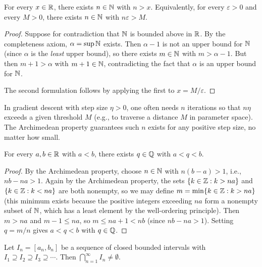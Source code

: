 \documentclass[11pt,a4paper]{article}
\begin{document}
\begin{theorem}
\label{thm:archimedean}
For every $x \in \mathbb{R}$, there exists $n \in \mathbb{N}$ with $n > x$.
Equivalently, for every $\varepsilon > 0$ and every $M > 0$, there exists
$n \in \mathbb{N}$ with $n\varepsilon > M$.
\end{theorem}

\begin{proof}
Suppose for contradiction that $\mathbb{N}$ is bounded above in $\mathbb{R}$. By the
completeness axiom, $\alpha = \sup \mathbb{N}$ exists. Then $\alpha - 1$ is not
an upper bound for $\mathbb{N}$ (since $\alpha$ is the \emph{least} upper
bound), so there exists $m \in \mathbb{N}$ with $m > \alpha - 1$. But then
$m + 1 > \alpha$ with $m + 1 \in \mathbb{N}$, contradicting the fact that
$\alpha$ is an upper bound for $\mathbb{N}$.

The second formulation follows by applying the first to
$x = M/\varepsilon$.
\end{proof}

\begin{example}
\label{ex:archimedean_step_size}
In gradient descent with step size $\eta > 0$, one often needs
$n$ iterations so that $n\eta$ exceeds a given threshold $M$
(e.g., to traverse a distance $M$ in parameter space). The Archimedean
property guarantees such $n$ exists for any positive step size, no matter
how small.
\end{example}

\begin{theorem}
\label{thm:density_Q}
For every $a, b \in \mathbb{R}$ with $a < b$, there exists $q \in \mathbb{Q}$ with
$a < q < b$.
\end{theorem}

\begin{proof}
By the Archimedean property, choose $n \in \mathbb{N}$ with $n(b - a) > 1$,
i.e., $nb - na > 1$. Again by the Archimedean property, the sets
$\{k \in \mathbb{Z} : k > na\}$ and $\{k \in \mathbb{Z} : k < na\}$ are both nonempty,
so we may define $m = \min\{k \in \mathbb{Z} : k > na\}$ (this minimum exists
because the positive integers exceeding $na$ form a nonempty subset of
$\mathbb{N}$, which has a least element by the well-ordering principle). Then
$m > na$ and $m - 1 \le na$, so $m \le na + 1 < nb$ (since
$nb - na > 1$). Setting $q = m/n$ gives $a < q < b$ with $q \in \mathbb{Q}$.
\end{proof}

\begin{theorem}
\label{thm:nested_intervals}
Let $I_n = [a_n, b_n]$ be a sequence of closed bounded intervals with
$I_1 \supseteq I_2 \supseteq I_3 \supseteq \cdots$. Then
$\bigcap_{n=1}^\infty I_n \neq \emptyset$.
\end{theorem}
\end{document}

